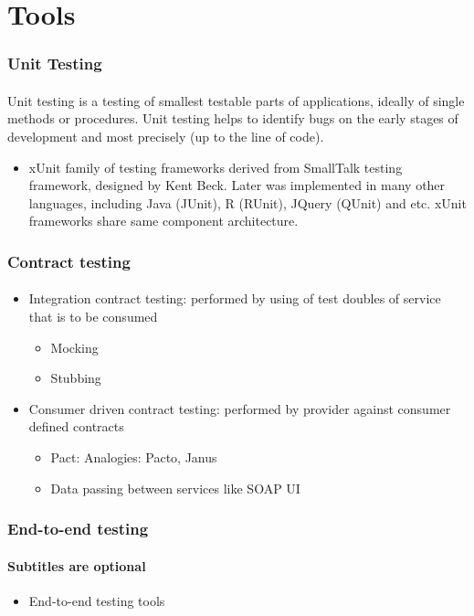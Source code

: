 \documentclass{beamer}
\begin{document}
\section{Tools}

\begin{frame}
	\frametitle{Unit Testing}
	\framesubtitle{}
	Unit testing is a testing of smallest testable parts of applications, ideally of single methods or procedures. Unit testing helps to identify bugs on the early stages of development and most precisely (up to the line of code).  
	\begin{itemize}
 		 \item xUnit family of testing frameworks derived from SmallTalk testing framework, designed by Kent Beck. Later was implemented in many other languages, including Java (JUnit), R (RUnit), JQuery (QUnit) and etc. xUnit frameworks share same component architecture.
	\end{itemize}
\end{frame}

\begin{frame}
	\frametitle{Contract testing}
	\framesubtitle{}

	\begin{itemize}
 		\item Integration contract testing: performed by using of test doubles of service that is to be consumed
			\begin{itemize}
				\item Mocking 
				\item Stubbing
			\end{itemize}
		\item Consumer driven contract testing: performed by provider against consumer defined contracts
			\begin{itemize}
				\item Pact: Analogies: Pacto, Janus
				\item Data passing between services like SOAP UI
			\end{itemize}
	\end{itemize}
\end{frame}

\begin{frame}
	\frametitle{End-to-end testing}
	\framesubtitle{Subtitles are optional}
	\begin{itemize}
 		 \item End-to-end testing tools
	\end{itemize}
\end{frame}
\end{document}
